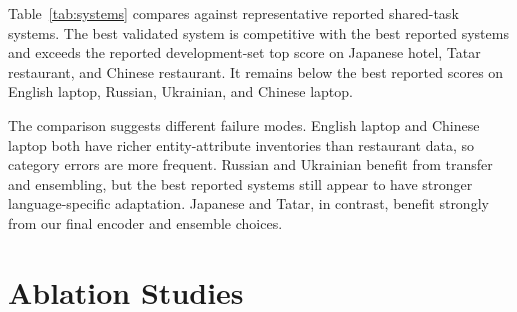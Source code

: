 \documentclass[runningheads]{llncs}
\begin{document}
Table~\ref{tab:systems} compares against representative reported
shared-task systems. The best validated system is competitive with the best
reported systems and exceeds the reported development-set top score on
Japanese hotel, Tatar restaurant, and Chinese restaurant.
It remains below the best reported scores on English laptop, Russian,
Ukrainian, and Chinese laptop.

The comparison suggests different failure modes. English laptop and
Chinese laptop both have richer entity-attribute inventories than
restaurant data, so category errors are more frequent. Russian and
Ukrainian benefit from transfer and ensembling, but the best reported
systems still appear to have stronger language-specific adaptation.
Japanese and Tatar, in contrast, benefit strongly from our final
encoder and ensemble choices.

\begin{table}[t]
\centering
\caption{Comparison with representative reported systems from the shared-task overview.}
\label{tab:systems}
\end{table}

\section{Ablation Studies}
\end{document}

